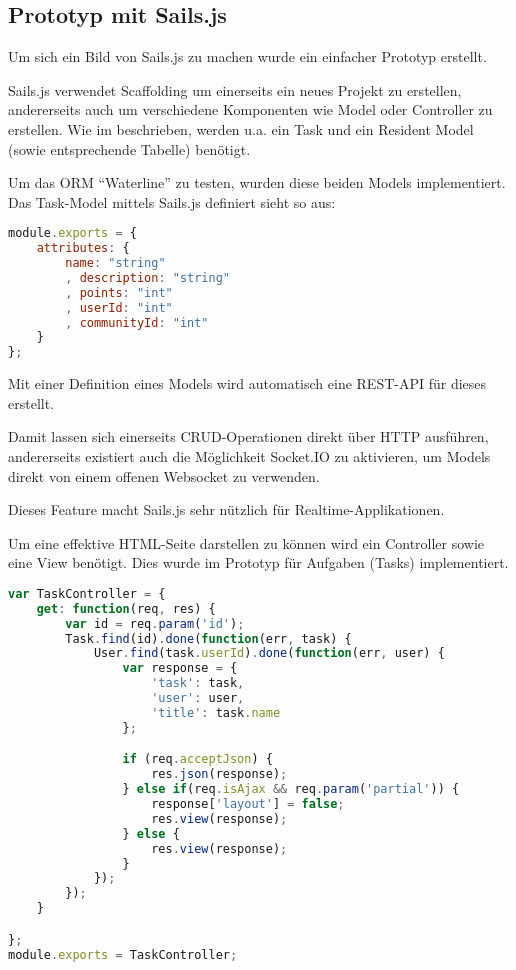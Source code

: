 \subsection{Prototyp mit Sails.js}
Um sich ein Bild von Sails.js zu machen wurde ein einfacher Prototyp \cite{SailsPrototyp} erstellt.

Sails.js verwendet \gls{Scaffolding} um einerseits ein neues Projekt zu erstellen, andererseits auch um verschiedene Komponenten wie Model oder Controller zu erstellen. Wie im  beschrieben, werden u.a. ein Task und ein Resident Model (sowie entsprechende Tabelle) benötigt.

Um das \gls{ORM} ``Waterline'' \cite{Waterline} zu testen, wurden diese beiden Models implementiert. Das Task-Model mittels Sails.js definiert sieht so aus:

\begin{lstlisting}[language=JavaScript, caption=Task Model in Sails.js]
module.exports = {
	attributes: {
		name: "string"
		, description: "string"
		, points: "int"
		, userId: "int"
		, communityId: "int"
	}
};
\end{lstlisting}

Mit einer Definition eines Models wird automatisch eine \gls{REST}-API für dieses erstellt.

Damit lassen sich einerseits CRUD-Operationen direkt über HTTP ausführen, andererseits existiert auch die Möglichkeit Socket.IO \cite{SocketIO} zu aktivieren, um Models direkt von einem offenen \gls{Websocket} zu verwenden.

Dieses Feature macht Sails.js sehr nützlich für \gls{Realtime}-Applikationen.

Um eine effektive HTML-Seite darstellen zu können wird ein Controller sowie eine View benötigt. Dies wurde im Prototyp für Aufgaben (Tasks) implementiert.

\begin{lstlisting}[language=JavaScript, caption=Task Controller in Sails.js, label=lst:sailsjstaskcontroller]
var TaskController = {
	get: function(req, res) {
		var id = req.param('id');
		Task.find(id).done(function(err, task) {
			User.find(task.userId).done(function(err, user) {
				var response = {
					'task': task,
					'user': user,
					'title': task.name
				};

				if (req.acceptJson) {
					res.json(response);
				} else if(req.isAjax && req.param('partial')) {
					response['layout'] = false;
					res.view(response);
				} else {
					res.view(response);
				}
			});
		});
	}

};
module.exports = TaskController;
\end{lstlisting}

